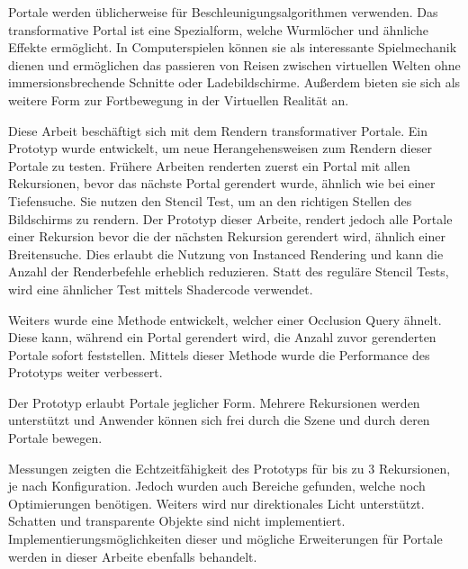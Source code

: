 
Portale werden üblicherweise für Beschleunigungsalgorithmen verwenden. Das transformative Portal ist eine Spezialform, welche Wurmlöcher und ähnliche Effekte ermöglicht. In Computerspielen können sie als interessante Spielmechanik dienen und ermöglichen das passieren von Reisen zwischen virtuellen Welten ohne immersionsbrechende Schnitte oder Ladebildschirme. Außerdem bieten sie sich als weitere Form zur Fortbewegung in der Virtuellen Realität an.

Diese Arbeit beschäftigt sich mit dem Rendern transformativer Portale. Ein Prototyp wurde entwickelt, um neue Herangehensweisen zum Rendern dieser Portale zu testen. Frühere Arbeiten renderten zuerst ein Portal mit allen Rekursionen, bevor das nächste Portal gerendert wurde, ähnlich wie bei einer Tiefensuche. Sie nutzen den Stencil Test, um an den richtigen Stellen des Bildschirms zu rendern.  Der Prototyp dieser Arbeite, rendert jedoch alle Portale einer Rekursion bevor die der nächsten Rekursion gerendert wird, ähnlich einer Breitensuche. Dies erlaubt die Nutzung von Instanced Rendering und kann die Anzahl der Renderbefehle erheblich reduzieren. Statt des reguläre Stencil Tests, wird eine ähnlicher Test mittels Shadercode verwendet.

Weiters wurde eine Methode entwickelt, welcher einer Occlusion Query ähnelt. Diese kann, während ein Portal gerendert wird, die Anzahl zuvor gerenderten Portale sofort feststellen. Mittels dieser Methode wurde die Performance des Prototyps weiter verbessert.

Der Prototyp erlaubt Portale jeglicher Form. Mehrere Rekursionen werden unterstützt und Anwender können sich frei durch die Szene und durch deren Portale bewegen.

Messungen zeigten die Echtzeitfähigkeit des Prototyps für bis zu 3 Rekursionen, je nach Konfiguration. Jedoch wurden auch Bereiche gefunden, welche noch Optimierungen benötigen. Weiters wird nur direktionales Licht unterstützt. Schatten und transparente Objekte sind nicht implementiert. Implementierungsmöglichkeiten dieser und mögliche Erweiterungen für Portale werden in dieser Arbeite ebenfalls behandelt.

